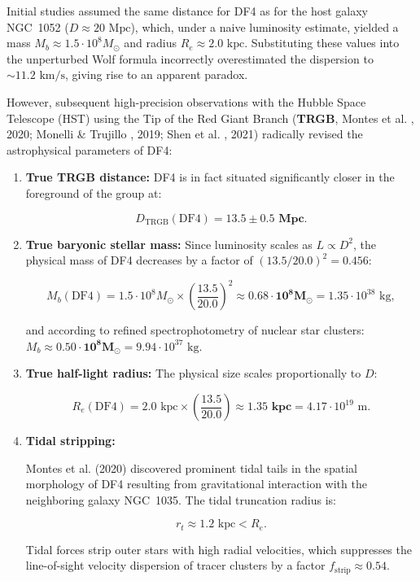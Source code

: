 Initial studies assumed the same distance for DF4 as for the host galaxy NGC~1052 ($D \approx 20\text{ Mpc}$), which, under a naive luminosity estimate, yielded a mass $M_b \approx 1.5 \cdot 10^8 M_\odot$ and radius $R_e \approx 2.0\text{ kpc}$. Substituting these values into the unperturbed Wolf formula incorrectly overestimated the dispersion to $\sim 11.2\text{ km/s}$, giving rise to an apparent paradox.

However, subsequent high-precision observations with the Hubble Space Telescope (HST) using the Tip of the Red Giant Branch (\textbf{TRGB}, Montes et al. \cite{ref30}, 2020; Monelli \& Trujillo \cite{ref31}, 2019; Shen et al. \cite{ref32}, 2021) radically revised the astrophysical parameters of DF4:

\begin{enumerate}
\item \textbf{True TRGB distance:} DF4 is in fact situated significantly closer in the foreground of the group at:

\begin{equation*}
D_{\text{TRGB}}(\text{DF4}) = \mathbf{13.5 \pm 0.5\text{ Mpc}}.
\end{equation*}

\item \textbf{True baryonic stellar mass:} Since luminosity scales as $L \propto D^2$, the physical mass of DF4 decreases by a factor of $(13.5 / 20.0)^2 = 0.456$:

\begin{equation*}
M_b(\text{DF4}) = 1.5 \cdot 10^8 M_\odot \times \left( \frac{13.5}{20.0} \right)^2 \approx \mathbf{0.68 \cdot 10^8 M_\odot} = 1.35 \cdot 10^{38}\text{ kg},
\end{equation*}

and according to refined spectrophotometry of nuclear star clusters: $M_b \approx \mathbf{0.50 \cdot 10^8 M_\odot} = 9.94 \cdot 10^{37}\text{ kg}$.

\item \textbf{True half-light radius:} The physical size scales proportionally to $D$:

\begin{equation*}
R_e(\text{DF4}) = 2.0\text{ kpc} \times \left( \frac{13.5}{20.0} \right) \approx \mathbf{1.35\text{ kpc}} = 4.17 \cdot 10^{19}\text{ m}.
\end{equation*}

\item \textbf{Tidal stripping:}  

Montes et al. \cite{ref30} (2020) discovered prominent tidal tails in the spatial morphology of DF4 resulting from gravitational interaction with the neighboring galaxy NGC~1035. The tidal truncation radius is:

\begin{equation*}
r_t \approx 1.2\text{ kpc} < R_e.
\end{equation*}

Tidal forces strip outer stars with high radial velocities, which suppresses the line-of-sight velocity dispersion of tracer clusters by a factor $f_{\text{strip}} \approx 0.54$.
\end{enumerate}

